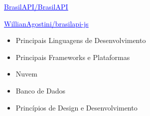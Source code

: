 \documentclass[10pt,a4paper,ragged2e,withhyper]{altacv}
\begin{document}
\begin{paracol}{2}
\href{https://github.com/BrasilAPI/BrasilAPI/issues?q=commenter%3AWillianAgostini+}{\textcolor{blue}{\underline{BrasilAPI/BrasilAPI}}}

\href{https://github.com/WillianAgostini/brasilapi-js}{\textcolor{blue}{\underline{WillianAgostini/brasilapi-js}}}



\switchcolumn




\begin{itemize}
\item{Principais Linguagens de Desenvolvimento}
\end{itemize}


\divider\smallskip

\begin{itemize}
\item{Principais Frameworks e Plataformas}
\end{itemize}

\divider\smallskip

\begin{itemize}
\item{Nuvem}
\end{itemize}

\divider\smallskip

\begin{itemize}
\item{Banco de Dados}
\end{itemize}

\divider\smallskip

\begin{itemize}
\item{Princípios de Design e Desenvolvimento}
\end{itemize}

\divider\smallskip


\end{paracol}
\end{document}
